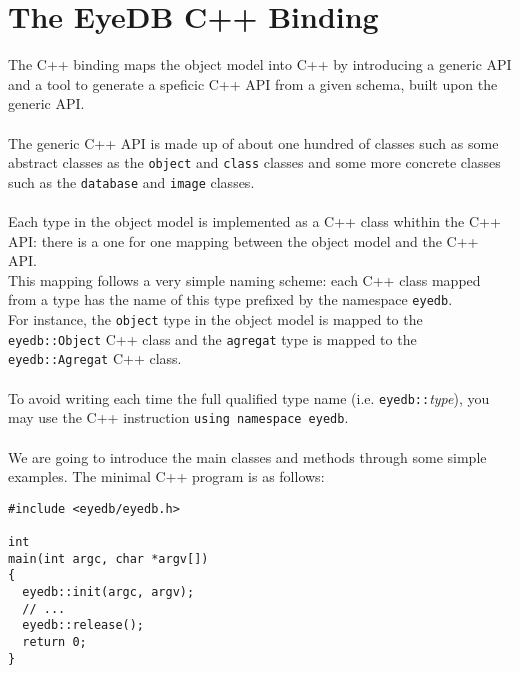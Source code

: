 

\newcommand{\mantitle}{\textsc{C++ Binding} }


\tableofcontents

\chapter*{The EyeDB C++ Binding}

The C++ binding maps the \eyedb object model into C++ by introducing
a generic API
and a tool to generate a speficic C++ API from a given schema,
built upon the generic API.
\\
\\
The generic C++ API is made up of about one hundred of classes such
as some abstract classes as the \texttt{object} and \texttt{class} classes
and some more concrete classes such as the \texttt{database} and \texttt{image}
classes.
\\
\\
Each type in the \eyedb object model is implemented as a C++ class whithin
the C++ API: there is a one for one mapping between the object model and
the C++ API.
\\
This mapping follows a very simple naming scheme: each C++ class mapped from
a type has the name of this type prefixed by the namespace \texttt{eyedb}.
\\
For instance, the \texttt{object} type in the \eyedb object model is
mapped to the \texttt{eyedb::Object} C++ class and the \texttt{agregat}
type is mapped to the \texttt{eyedb::Agregat} C++ class.
\\
\\
To avoid writing each time the full qualified type name
(i.e. \texttt{eyedb::}\emph{type}), you may use the C++ instruction
\texttt{using namespace eyedb}.
\\
\\
We are going to introduce the main classes and methods through some simple
examples.
The minimal \eyedb C++ program is as follows:
\verbsize
\begin{verbatim}
#include <eyedb/eyedb.h>

int
main(int argc, char *argv[])
{
  eyedb::init(argc, argv);
  // ...
  eyedb::release();
  return 0;
}
\end{verbatim}
